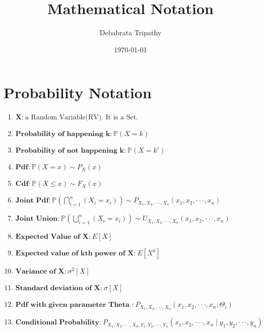 \documentclass{article}
\title{\bf Mathematical Notation}
\author {Debabrata Tripathy}
\date{\today}
\begin{document}
\maketitle

\section*{Probability Notation}


\begin{enumerate}

\item \(\textbf{X:} \  \text{a Random Variable(RV). It is a Set.}\)

\item \(\textbf{Probability of happening k:} \  \mathbb{P}\left ( X={k} \right ) \)

\item \(\textbf{Probability of not happening k:} \  \mathbb{P}\left ( X={k}' \right ) \)

\item \(\textbf{Pdf:} \  \mathbb{P}\left ( X=x \right )\sim P_{X}\left ( x \right )\)

\item \(\textbf{Cdf:} \  \mathbb{P}\left ( X\leq x \right )\sim F_{X}\left ( x \right )\)

\item \(\textbf{Joint Pdf:} \  \mathbb{P}\left (\bigcap_{i = 1}^{n} \left ( X_{i}=x_{i}  \right )\right )\sim P_{ X_{1},X_{2},\cdot \cdot \cdot ,X_{n}}\left ( x_{1},x_{2},\cdot \cdot \cdot ,x_{n}\right )\)

\item \(\textbf{Joint Union:}\  \mathbb{P}\left (\bigcup_{i = 1}^{n} \left ( X_{i}=x_{i}  \right )\right )\sim U_{ X_{1},X_{2},\cdot \cdot \cdot ,X_{n}}\left ( x_{1},x_{2},\cdot \cdot \cdot ,x_{n}\right)\)

\item \(\textbf{Expected Value of X:} \   E\left [ X \right]\)

\item \( \textbf{Expected value of kth power of X:} \   E\left [ X^{k} \right]\)

\item \(\textbf{Variance of X:} \   \sigma ^{2} \left [ X \right]\)

\item \(\textbf{Standard deviation of X:} \   \sigma \left [ X \right]\)

\item \(\textbf{Pdf with given parameter Theta :} \   P_{ X_{1},X_{2},\cdot \cdot \cdot ,X_{n}}\left ( x_{1},x_{2},\cdot \cdot \cdot ,x_{n} ; \Theta _{i} \right )\)

\item \(\textbf{Conditional Probability:} \   P_{ X_{1},X_{2},\cdot \cdot \cdot ,X_{n},Y_{1},Y_{2},\cdot \cdot \cdot ,Y_{n}}\left ( x_{1},x_{2},\cdot \cdot \cdot ,x_{n} \mid y_{1},y_{2},\cdot \cdot \cdot ,y_{n}\right )\)


\end{enumerate}
\end{document}

